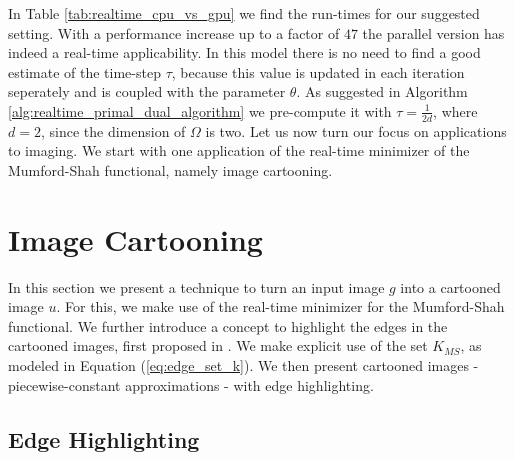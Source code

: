 \documentclass[abstracton]{scrreprt}
\begin{document}
        In Table \ref{tab:realtime_cpu_vs_gpu} we find the run-times for our suggested setting. With a performance increase up to a factor of $47$ the parallel version has indeed a real-time applicability. In this model there is no need to find a good estimate of the time-step $\tau$, because this value is updated in each iteration seperately and is coupled with the parameter $\theta$. As suggested in Algorithm \ref{alg:realtime_primal_dual_algorithm} we pre-compute it with $\tau = \frac{1}{2d}$, where $d = 2$, since the dimension of $\Omega$ is two. Let us now turn our focus on applications to imaging. We start with one application of the real-time minimizer of the Mumford-Shah functional, namely image cartooning.



    \section{Image Cartooning} %
    \label{sec:image_cartooning}
        
        In this section we present a technique to turn an input image $g$ into a cartooned image $u$. For this, we make use of the real-time minimizer for the Mumford-Shah functional. We further introduce a concept to highlight the edges in the cartooned images, first proposed in \cite{Strekalovskiy-Cremers-eccv14}. We make explicit use of the set $K_{MS}$, as modeled in Equation (\ref{eq:edge_set_k}). We then present cartooned images - piecewise-constant approximations - with edge highlighting.


        \subsection{Edge Highlighting} %
        \label{sub:edge_highlighting}
            
\end{document}
